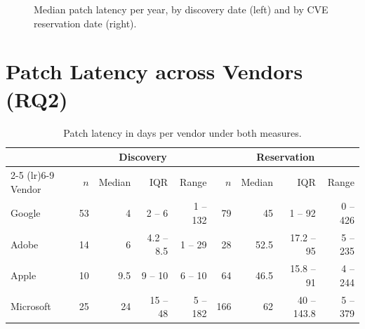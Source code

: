 \begin{figure}[h]
    \centering
    \caption{Median patch latency per year, by discovery date (left) and by CVE reservation date (right).}
    \label{fig:latency-per-year}
\end{figure}

\section{Patch Latency across Vendors (RQ2)}

\begin{table}[h]
    \centering
    \caption{Patch latency in days per vendor under both measures.}
    \label{tab:vendors}
    \small
    \setlength{\tabcolsep}{4pt}
    \begin{tabular}{lrrrrrrrr}
        \toprule
        & \multicolumn{4}{c}{Discovery} & \multicolumn{4}{c}{Reservation} \\
        \cmidrule(lr){2-5} \cmidrule(lr){6-9}
        Vendor & $n$ & Median & IQR & Range & $n$ & Median & IQR & Range \\
        \midrule
        Google    & 53 & 4 & 2 -- 6 & 1 -- 132 & 79 & 45 & 1 -- 92 & 0 -- 426 \\
        Adobe     & 14 & 6 & 4.2 -- 8.5 & 1 -- 29 & 28 & 52.5 & 17.2 -- 95 & 5 -- 235 \\
        Apple     & 10 & 9.5 & 9 -- 10 & 6 -- 10 & 64 & 46.5 & 15.8 -- 91 & 4 -- 244 \\
        Microsoft & 25 & 24 & 15 -- 48 & 5 -- 182 & 166 & 62 & 40 -- 143.8 & 5 -- 379 \\
        \bottomrule
    \end{tabular}
\end{table}

